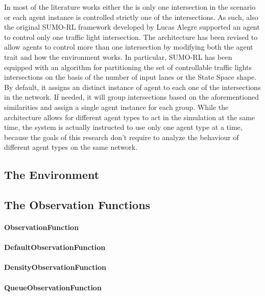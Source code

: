 In most of the literature works either the is only one intersection in the scenario or each agent instance is controlled strictly one of the intersections. As such, also the original SUMO-RL framework \cite{sumorl} developed by Lucas Alegre supported an agent to control only one traffic light intersection.
The architecture has been revised to allow agents to control more than one intersection by modifying both the agent trait and how the environment works.
In particular, SUMO-RL has been equipped with an algorithm for partitioning the set of controllable traffic lights intersections on the basis of the number of input lanes or the State Space shape.
By default, it assigns an distinct instance of agent to each one of the intersections in the network. If needed, it will group intersections based on the aforementioned similarities and assign a single agent instance for each group.
While the architecture allows for different agent types to act in the simulation at the same time, the system is actually instructed to use only one agent type at a time, because the goals of this research don't require to analyze the behaviour of different agent types on the same network.



\subsection{The Environment}

\subsection{The Observation Functions}

\paragraph{ObservationFunction}
\paragraph{DefaultObservationFunction}
\paragraph{DensityObservationFunction}
\paragraph{QueueObservationFunction}
